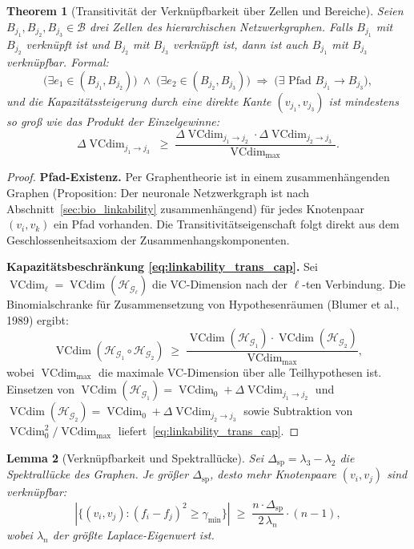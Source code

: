 \documentclass[12pt, a4paper, openany]{report}
\newtheorem{theorem}{Theorem}[chapter]
\newtheorem{lemma}[theorem]{Lemma}
\newcommand{\calG}{\mathcal{G}}
\newcommand{\calH}{\mathcal{H}}
\newcommand{\calB}{\mathcal{B}}
\DeclareMathOperator{\VC}{VCdim}
\begin{document}
\begin{theorem}[Transitivität der Verknüpfbarkeit über Zellen und Bereiche]
\label{thm:linkability_transitivity}
Seien $B_{j_1}, B_{j_2}, B_{j_3} \in \calB$ drei Zellen des hierarchischen
Netzwerkgraphen.  Falls $B_{j_1}$ mit $B_{j_2}$ verknüpft ist und
$B_{j_2}$ mit $B_{j_3}$ verknüpft ist, dann ist auch $B_{j_1}$ mit $B_{j_3}$
verknüpfbar.  Formal:
\begin{equation}
  \label{eq:linkability_transitivity}
  \bigl(\exists e_1 \in (B_{j_1}, B_{j_2})\bigr)
  \;\wedge\;
  \bigl(\exists e_2 \in (B_{j_2}, B_{j_3})\bigr)
  \;\Rightarrow\;
  \bigl(\exists \text{ Pfad } B_{j_1} \to B_{j_3}\bigr),
\end{equation}
und die Kapazitätssteigerung durch eine direkte Kante $(v_{j_1}, v_{j_3})$
ist mindestens so groß wie das Produkt der Einzelgewinne:
\begin{equation}
  \label{eq:linkability_trans_cap}
  \Delta\VC_{j_1 \to j_3}
  \;\geq\;
  \frac{\Delta\VC_{j_1 \to j_2} \cdot \Delta\VC_{j_2 \to j_3}}
       {\VC_{\max}}.
\end{equation}
\end{theorem}

\begin{proof}
\textbf{Pfad-Existenz.}
Per Graphentheorie ist in einem zusammenhängenden Graphen (Proposition:
Der neuronale Netzwerkgraph ist nach Abschnitt~\ref{sec:bio_linkability}
zusammenhängend) für jedes Knotenpaar $(v_{i}, v_{k})$ ein Pfad vorhanden.
Die Transitivitätseigenschaft folgt direkt aus dem Geschlossenheitsaxiom
der Zusammenhangskomponenten.

\textbf{Kapazitätsbeschränkung \eqref{eq:linkability_trans_cap}.}
Sei $\VC_\ell = \VC(\calH_{\calG_\ell})$ die VC-Dimension nach der
$\ell$-ten Verbindung.  Die Binomialschranke für Zusammensetzung von
Hypothesenräumen (Blumer et al., 1989) ergibt:
\[
  \VC(\calH_{\calG_1} \circ \calH_{\calG_2})
  \;\geq\;
  \frac{\VC(\calH_{\calG_1}) \cdot \VC(\calH_{\calG_2})}{\VC_{\max}},
\]
wobei $\VC_{\max}$ die maximale VC-Dimension über alle Teilhypothesen ist.
Einsetzen von $\VC(\calH_{\calG_1}) = \VC_0 + \Delta\VC_{j_1 \to j_2}$
und $\VC(\calH_{\calG_2}) = \VC_0 + \Delta\VC_{j_2 \to j_3}$ sowie
Subtraktion von $\VC_0^2 / \VC_{\max}$ liefert~\eqref{eq:linkability_trans_cap}.
\end{proof}

\begin{lemma}[Verknüpfbarkeit und Spektrallücke]
\label{lem:linkability_gap}
Sei $\Delta_{\mathrm{sp}} = \lambda_3 - \lambda_2$ die Spektrallücke des
Graphen.  Je größer $\Delta_{\mathrm{sp}}$, desto mehr Knotenpaare
$(v_i, v_j)$ sind verknüpfbar:
\begin{equation}
  \label{eq:linkability_gap_bound}
  |\{(v_i, v_j) : (f_i - f_j)^2 \geq \gamma_{\min}\}|
  \;\geq\;
  \frac{n \cdot \Delta_{\mathrm{sp}}}{2\,\lambda_n} \cdot (n-1),
\end{equation}
wobei $\lambda_n$ der größte Laplace-Eigenwert ist.
\end{lemma}
\end{document}
